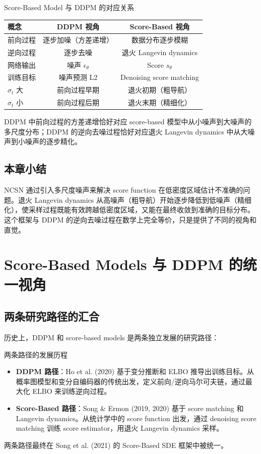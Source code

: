 \documentclass[a4paper]{article}
\begin{document}
\begin{importantbox}{Score-Based Model 与 DDPM 的对应关系}
\begin{center}
\begin{tabular}{lcc}
\toprule
\textbf{概念} & \textbf{DDPM 视角} & \textbf{Score-Based 视角} \\
\midrule
前向过程 & 逐步加噪（方差递增） & 数据分布逐步模糊 \\
逆向过程 & 逐步去噪 & 退火 Langevin dynamics \\
网络输出 & 噪声 $\epsilon_\theta$ & Score $s_\theta$ \\
训练目标 & 噪声预测 L2 & Denoising score matching \\
$\sigma_t$ 大 & 前向过程早期 & 退火初期（粗导航） \\
$\sigma_t$ 小 & 前向过程后期 & 退火末期（精细化） \\
\bottomrule
\end{tabular}
\end{center}
DDPM 中前向过程的方差递增恰好对应 score-based 模型中从小噪声到大噪声的多尺度分布；DDPM 的逆向去噪过程恰好对应退火 Langevin dynamics 中从大噪声到小噪声的逐步精化。
\end{importantbox}

\subsection{本章小结}

NCSN 通过引入多尺度噪声来解决 score function 在低密度区域估计不准确的问题。退火 Langevin dynamics 从高噪声（粗导航）开始逐步降低到低噪声（精细化），使采样过程既能有效跨越低密度区域，又能在最终收敛到准确的目标分布。这个框架与 DDPM 的逆向去噪过程在数学上完全等价，只是提供了不同的视角和直觉。

\section{Score-Based Models 与 DDPM 的统一视角}

\subsection{两条研究路径的汇合}

历史上，DDPM 和 score-based models 是两条独立发展的研究路径：

\begin{knowledgebox}{两条路径的发展历程}
\begin{itemize}
    \item \textbf{DDPM 路径}：Ho et al. (2020) 基于变分推断和 ELBO 推导出训练目标。从概率图模型和变分自编码器的传统出发，定义前向/逆向马尔可夫链，通过最大化 ELBO 来训练逆向过程。
    \item \textbf{Score-Based 路径}：Song \& Ermon (2019, 2020) 基于 score matching 和 Langevin dynamics。从统计学中的 score function 出发，通过 denoising score matching 训练 score estimator，用退火 Langevin dynamics 采样。
\end{itemize}
两条路径最终在 Song et al. (2021) 的 Score-Based SDE 框架中被统一。
\end{knowledgebox}
\end{document}
